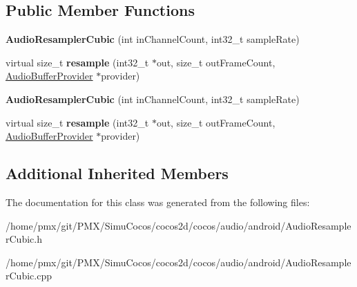 \subsection*{Public Member Functions}
\begin{DoxyCompactItemize}
\item 
\mbox{\label{classcocos2d_1_1experimental_1_1AudioResamplerCubic_ae4d9dc3c5bee779f3835175028c7cc3b}} 
{\bfseries Audio\+Resampler\+Cubic} (int in\+Channel\+Count, int32\+\_\+t sample\+Rate)
\item 
\mbox{\label{classcocos2d_1_1experimental_1_1AudioResamplerCubic_ad5558ded941b94bbd99be3c26f0b3d77}} 
virtual size\+\_\+t {\bfseries resample} (int32\+\_\+t $\ast$out, size\+\_\+t out\+Frame\+Count, \hyperlink{classcocos2d_1_1experimental_1_1AudioBufferProvider}{Audio\+Buffer\+Provider} $\ast$provider)
\item 
\mbox{\label{classcocos2d_1_1experimental_1_1AudioResamplerCubic_ae4d9dc3c5bee779f3835175028c7cc3b}} 
{\bfseries Audio\+Resampler\+Cubic} (int in\+Channel\+Count, int32\+\_\+t sample\+Rate)
\item 
\mbox{\label{classcocos2d_1_1experimental_1_1AudioResamplerCubic_ad5edb5af38c53c604972368144c71d58}} 
virtual size\+\_\+t {\bfseries resample} (int32\+\_\+t $\ast$out, size\+\_\+t out\+Frame\+Count, \hyperlink{classcocos2d_1_1experimental_1_1AudioBufferProvider}{Audio\+Buffer\+Provider} $\ast$provider)
\end{DoxyCompactItemize}
\subsection*{Additional Inherited Members}


The documentation for this class was generated from the following files\+:\begin{DoxyCompactItemize}
\item 
/home/pmx/git/\+P\+M\+X/\+Simu\+Cocos/cocos2d/cocos/audio/android/Audio\+Resampler\+Cubic.\+h\item 
/home/pmx/git/\+P\+M\+X/\+Simu\+Cocos/cocos2d/cocos/audio/android/Audio\+Resampler\+Cubic.\+cpp\end{DoxyCompactItemize}
